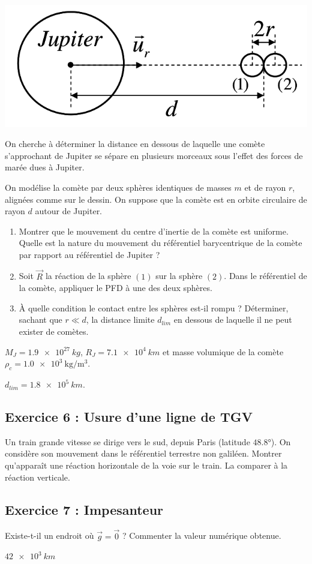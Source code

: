 \begin{minipage}[c]{\linewidth/2}
	\includegraphics[width=\linewidth]{Images/mp_s04_ex02.png}
\end{minipage}%
\begin{minipage}[c]{\linewidth/2}
	On cherche à déterminer la distance en dessous de laquelle une comète s'approchant de Jupiter se sépare en plusieurs morceaux sous l'effet des forces de marée dues à Jupiter.
	
	On modélise la comète par deux sphères identiques de masses $m$ et de rayon $r$, alignées comme sur le dessin. On suppose que la comète est en orbite circulaire de rayon $d$ autour de Jupiter.
\end{minipage} 

\begin{enumerate}
	\item Montrer que le mouvement du centre d'inertie de la comète est uniforme. Quelle est la nature du mouvement du référentiel barycentrique de la comète par rapport au référentiel de Jupiter ?
	\item Soit $\vec{R}$ la réaction de la sphère $(1)$ sur la sphère $(2)$. Dans le référentiel de la comète, appliquer le PFD à une des deux sphères.
	\item À quelle condition le contact entre les sphères est-il rompu ? Déterminer, sachant que $r \ll d$, la distance limite $d_{lim}$ en dessous de laquelle il ne peut exister de comètes.
\end{enumerate}

 $M_J = \SI{1.9e27}{kg}$, $R_J = \SI{7.1e4}{km}$ et masse volumique de la comète $\rho_c = \SI{1.0e3}{\kilogram\per\cubic\metre}$.

 $d_{lim} = \SI{1.8e5}{km}$.

\subsection{Exercice 6 : Usure d'une ligne de TGV}

Un train grande vitesse se dirige vers le sud, depuis Paris (latitude $48.8$°). On considère son mouvement dans le référentiel terrestre non galiléen. Montrer qu'apparaît une réaction horizontale de la voie sur le train. La comparer à la réaction verticale. 


\subsection{Exercice 7 : Impesanteur}

Existe-t-il un endroit où $\vec{g} = \vec{0}$ ? Commenter la valeur numérique obtenue.

 $\SI{42e3}{km}$